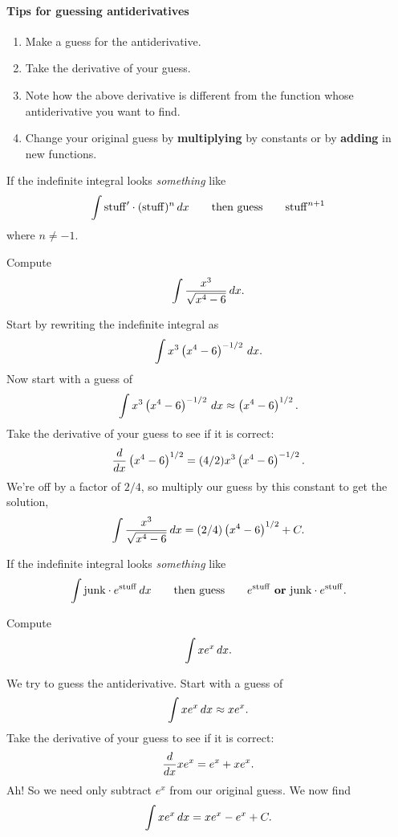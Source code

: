 \documentclass{ximera}
\begin{document}
\paragraph{Tips for guessing antiderivatives}
\begin{enumerate}
\item Make a guess for the antiderivative.
\item Take the derivative of your guess.
\item Note how the above derivative is different from the function
  whose antiderivative you want to find.
\item Change your original guess by \textbf{multiplying} by constants
  or by \textbf{adding} in new functions.
\end{enumerate}

\begin{template}\label{template:powerchain}
If the indefinite integral looks \emph{something} like
\[
\int \mathrm{stuff}' \cdot (\mathrm{stuff})^n \,d x \qquad\text{then guess} \qquad \mathrm{stuff}^{n+1}
\]
where $n\ne -1$.
\end{template}

\begin{example} Compute
\[
\int \frac{x^3}{\sqrt{x^4 -6}} \,d x.
\]


Start by rewriting the indefinite integral as
\[
\int x^3\left(x^4 -6\right)^{-1/2} \,d x.
\]
Now start with a guess of 
\[
\int x^3\left(x^4 -6\right)^{-1/2} \,d x \approx \left(x^4 -6\right)^{1/2}.
\]
Take the derivative of your guess to see if it is correct:
\[
\frac{d}{dx}  \left(x^4 -6\right)^{1/2} = (4/2)x^3\left(x^4 -6\right)^{-1/2}.
\]
We're off by a factor of $2/4$, so multiply our guess by this constant
to get the solution,
\[
\int \frac{x^3}{\sqrt{x^4 -6}} \,d x = (2/4)\left(x^4 -6\right)^{1/2}+C.
\]
\end{example}


\begin{template}\label{template:echain}
If the indefinite integral looks \emph{something} like
\[
\int \mathrm{junk}\cdot e^{\mathrm{stuff}} \,d x \qquad\text{then
  guess}\qquad e^{\mathrm{stuff}} \text{ \textbf{or} }\mathrm{junk}
\cdot e^{\mathrm{stuff}}.
\]
\end{template}


\begin{example}
Compute
\[
\int xe^{x} \,d x.
\]


We try to guess the antiderivative. Start with a guess of
\[
\int xe^x \,d x \approx xe^x.
\]
Take the derivative of your guess to see if it is correct:
\[
\frac{d}{dx} xe^x = e^x + xe^x.
\]
Ah! So we need only subtract $e^x$ from our original guess.  We now
find
\[
\int xe^x \,d x =xe^x - e^x + C.
\]
\end{example}
\end{document}
